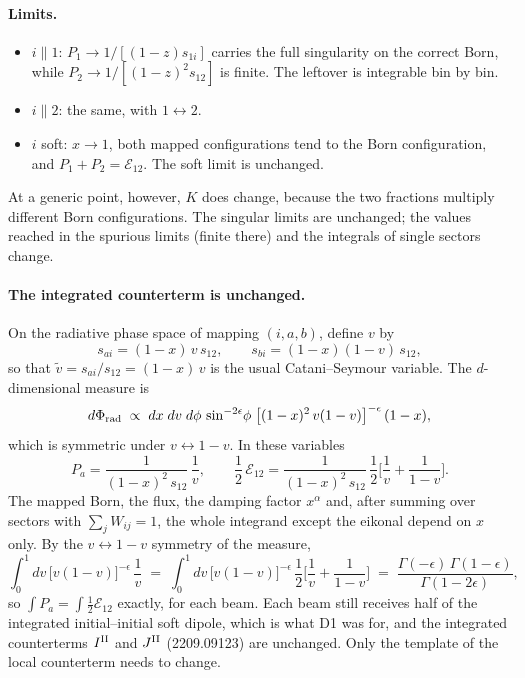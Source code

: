 \documentclass[11pt,a4paper]{article}
\newcommand{\E}{\mathcal E}
\begin{document}
\paragraph{Limits.}
\begin{itemize}
\item $i\parallel1$: $P_1\to 1/[(1-z)s_{1i}]$ carries the full singularity on
      the correct Born, while $P_2\to 1/[(1-z)^2 s_{12}]$ is finite. The leftover is
      integrable bin by bin.
\item $i\parallel2$: the same, with $1\leftrightarrow2$.
\item $i$ soft: $x\to1$, both mapped configurations tend to the Born
      configuration, and $P_1+P_2=\E_{12}$. The soft limit is unchanged.
\end{itemize}
At a generic point, however, $K$ does change, because the two fractions
multiply different Born configurations. The singular limits are unchanged; the
values reached in the spurious limits (finite there) and the integrals of
single sectors change.

\paragraph{The integrated counterterm is unchanged.}
On the radiative phase space of mapping $(i,a,b)$, define $v$ by
\begin{equation}
  s_{ai} = (1-x)\,v\,s_{12},\qquad s_{bi}=(1-x)(1-v)\,s_{12},
\end{equation}
so that $\tilde v = s_{ai}/s_{12} = (1-x)\,v$ is the usual Catani--Seymour
variable. The $d$-dimensional measure is
\begin{equation}
  d\Phi_{\rm rad} \;\propto\; dx\;dv\;d\phi\,\sin^{-2\epsilon}\!\phi\;
  \big[(1-x)^2\,v(1-v)\big]^{-\epsilon}\,(1-x),
\end{equation}
which is symmetric under $v\leftrightarrow1-v$. In these variables
\begin{equation}
  P_a = \frac{1}{(1-x)^2\,s_{12}}\,\frac1v,
  \qquad
  \frac12\,\E_{12} = \frac{1}{(1-x)^2\,s_{12}}\,
  \frac{1}{2}\Big[\frac1v + \frac1{1-v}\Big].
\end{equation}
The mapped Born, the flux, the damping factor $x^\alpha$ and, after summing over
sectors with $\sum_j W_{ij}=1$, the whole integrand except the eikonal depend
on $x$ only. By the $v\leftrightarrow1-v$ symmetry of the measure,
\begin{equation}
  \int_0^1 dv\,\big[v(1-v)\big]^{-\epsilon}\,\frac1v
  \;=\;
  \int_0^1 dv\,\big[v(1-v)\big]^{-\epsilon}\,
  \frac12\Big[\frac1v+\frac1{1-v}\Big]
  \;=\; \frac{\Gamma(-\epsilon)\,\Gamma(1-\epsilon)}{\Gamma(1-2\epsilon)} ,
\end{equation}
so $\int P_a = \int\frac12\E_{12}$ exactly, for each beam. Each beam still
receives half of the integrated initial--initial soft dipole, which is what D1
was for, and the integrated counterterms $I^{\rm II}$ and $J^{\rm II}$
(2209.09123) are unchanged. Only the template of the local counterterm needs
to change.
\end{document}
